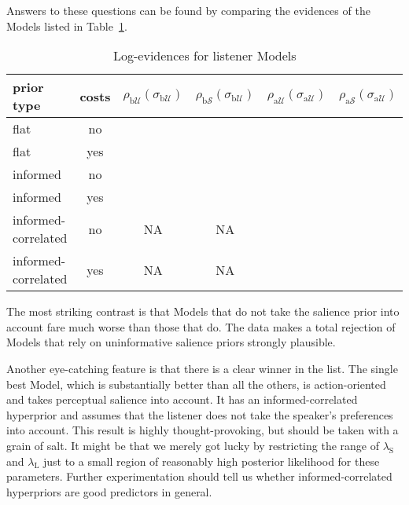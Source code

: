 Answers to these questions can be found by comparing the evidences of
the Models listed in Table~\ref{table:listener mod}.
%
\begin{table}[htb] 
\caption{Log-evidences for listener Models}
  \centering 
  \begin{tabular}{lccccc}
    prior type & costs &
    $\rho_{\mathrm{b}\mathcal{U}}(\sigma_{\mathrm{b}\mathcal{U}})$ 
    & $\rho_{\mathrm{b}\mathcal{S}}(\sigma_{\mathrm{b}\mathcal{U}})$
    & $\rho_{\mathrm{a}\mathcal{U}}(\sigma_{\mathrm{a}\mathcal{U}})$
    & $\rho_{\mathrm{a}\mathcal{S}}(\sigma_{\mathrm{a}\mathcal{U}})$
    \\ \midrule
    flat
    & no
    & \cellcolor{lightgray!76}{-24.83}
    & \cellcolor{lightgray!94}{-11.66} 
    & \cellcolor{lightgray!77}{-24.06} 
    & \cellcolor{lightgray!75}{-10.62} 
    \\ 
    flat
    & yes
    & \cellcolor{lightgray!76}{-24.80} 
    & \cellcolor{lightgray!96}{-9.84}
    & \cellcolor{lightgray!77}{-23.84}
    & \cellcolor{lightgray!95}{-10.81}
    \\ \addlinespace[0.1cm]
    informed
    & no
    & \cellcolor{lightgray!30}{-59.87} 
    & \cellcolor{lightgray!95}{-10.44}
    & \cellcolor{lightgray!75}{-25.42}
    & \cellcolor{lightgray!98}{-8.48}
    \\
    informed
    & yes
    & \cellcolor{lightgray!18}{-68.43}
    & \cellcolor{lightgray!91}{-13.35}
    & \cellcolor{lightgray!77}{-24.21}
    & \cellcolor{lightgray!93}{-11.85}
    \\ \addlinespace[0.1cm]
    informed-correlated
    & no
    & NA
    & NA
    & \cellcolor{lightgray!23}{-64.70} 
    & \cellcolor{lightgray!100}{-6.80}
    \\
    informed-correlated
    & yes
    & NA
    & NA
    & \cellcolor{lightgray!0}{-82.36} 
    & \cellcolor{lightgray!71}{-29.01}
    \\
  \end{tabular}
  \label{table:listener mod}
\end{table}

The most striking contrast is that Models that do not take the
salience prior into account fare much worse than those that do. The
data makes a total rejection of Models that rely on uninformative
salience priors strongly plausible.

Another eye-catching feature is that there is a clear winner in the
list. The single best Model, which is substantially better than all
the others, is action-oriented and takes perceptual salience into
account. It has an informed-correlated hyperprior and assumes that the
listener does not take the speaker's preferences into account. This
result is highly thought-provoking, but should be taken with a grain
of salt. It might be that we merely got lucky by restricting the range
of $\lambda_\mathrm{S}$ and $\lambda_\mathrm{L}$ just to a small
region of reasonably high posterior likelihood for these
parameters. Further experimentation should tell us whether
informed-correlated hyperpriors are good predictors in general.

